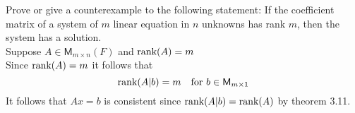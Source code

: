 Prove or give a counterexample to the following statement: If the
coefficient matrix of a system of $m$ linear equation in $n$ unknowns
has rank $m$, then the system has a solution.
\\Suppose $A\in \mathsf{M}_{m\times n}(F)$ and $\text{rank}({A})=m$
\\Since $\text{rank}({A})=m$ it follows that
\begin{equation}
\text{rank}({A|b}) = m\quad \text{for } b \in \mathsf{M}_{m\times 1}
\end{equation}
It follows that $Ax=b$ is consistent since $\text{rank}(A|b) =
\text{rank}({A})$ by theorem 3.11.



